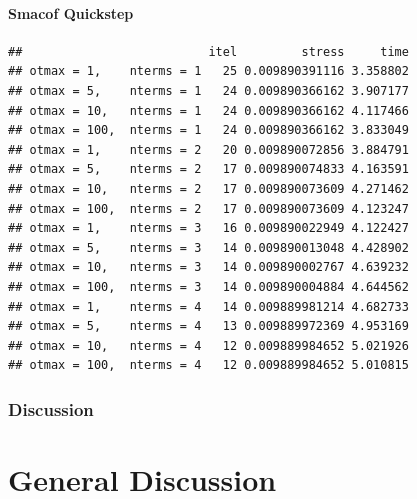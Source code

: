 \documentclass[
  12pt,
]{article}
\newenvironment{Shaded}{\begin{snugshade}}{\end{snugshade}}
\newcommand{\AttributeTok}[1]{\textcolor[rgb]{0.13,0.29,0.53}{#1}}
\newcommand{\DecValTok}[1]{\textcolor[rgb]{0.00,0.00,0.81}{#1}}
\newcommand{\FunctionTok}[1]{\textcolor[rgb]{0.13,0.29,0.53}{\textbf{#1}}}
\newcommand{\NormalTok}[1]{#1}
\newcommand{\OtherTok}[1]{\textcolor[rgb]{0.56,0.35,0.01}{#1}}
\newcommand{\SpecialCharTok}[1]{\textcolor[rgb]{0.81,0.36,0.00}{\textbf{#1}}}
\begin{document}
\paragraph{Smacof Quickstep}\label{smacof-quickstep-7}

\begin{Shaded}
\end{Shaded}

\begin{verbatim}
##                          itel         stress     time
## otmax = 1,    nterms = 1   25 0.009890391116 3.358802
## otmax = 5,    nterms = 1   24 0.009890366162 3.907177
## otmax = 10,   nterms = 1   24 0.009890366162 4.117466
## otmax = 100,  nterms = 1   24 0.009890366162 3.833049
## otmax = 1,    nterms = 2   20 0.009890072856 3.884791
## otmax = 5,    nterms = 2   17 0.009890074833 4.163591
## otmax = 10,   nterms = 2   17 0.009890073609 4.271462
## otmax = 100,  nterms = 2   17 0.009890073609 4.123247
## otmax = 1,    nterms = 3   16 0.009890022949 4.122427
## otmax = 5,    nterms = 3   14 0.009890013048 4.428902
## otmax = 10,   nterms = 3   14 0.009890002767 4.639232
## otmax = 100,  nterms = 3   14 0.009890004884 4.644562
## otmax = 1,    nterms = 4   14 0.009889981214 4.682733
## otmax = 5,    nterms = 4   13 0.009889972369 4.953169
## otmax = 10,   nterms = 4   12 0.009889984652 5.021926
## otmax = 100,  nterms = 4   12 0.009889984652 5.010815
\end{verbatim}

\subsubsection{Discussion}\label{discussion-6}

\section{General Discussion}\label{general-discussion}
\end{document}
